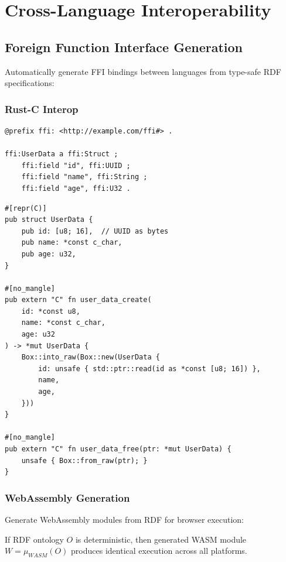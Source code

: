 \section{Cross-Language Interoperability}

\subsection{Foreign Function Interface Generation}

Automatically generate FFI bindings between languages from type-safe RDF specifications:

\subsubsection{Rust-C Interop}

\begin{verbatim}
@prefix ffi: <http://example.com/ffi#> .

ffi:UserData a ffi:Struct ;
    ffi:field "id", ffi:UUID ;
    ffi:field "name", ffi:String ;
    ffi:field "age", ffi:U32 .
\end{verbatim}

\begin{verbatim}
#[repr(C)]
pub struct UserData {
    pub id: [u8; 16],  // UUID as bytes
    pub name: *const c_char,
    pub age: u32,
}

#[no_mangle]
pub extern "C" fn user_data_create(
    id: *const u8,
    name: *const c_char,
    age: u32
) -> *mut UserData {
    Box::into_raw(Box::new(UserData {
        id: unsafe { std::ptr::read(id as *const [u8; 16]) },
        name,
        age,
    }))
}

#[no_mangle]
pub extern "C" fn user_data_free(ptr: *mut UserData) {
    unsafe { Box::from_raw(ptr); }
}
\end{verbatim}

\subsubsection{WebAssembly Generation}

Generate WebAssembly modules from RDF for browser execution:

\begin{theorem}
    If RDF ontology $O$ is deterministic, then generated WASM module $W = \mu_{WASM}(O)$ produces identical execution across all platforms.
\end{theorem}

